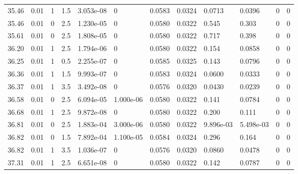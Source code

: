 \documentclass[preview]{standalone}
\begin{document}
{{{{{{\begin{tabular}{L{1.2cm}C{1.2cm} C{0.3cm}C{0.5cm} C{1.4cm}C{1.4cm} C{1.4cm}C{1.4cm} C{1.6cm}C{1.6cm} C{1.6cm}C{1.6cm}}
  35.46  &  0.01  & 1     & 1.5 &  3.053e-08  & 0  &  0.0583&   0.0324& 0.0713 & 0.0396   &  0 & 0  \\ 
  35.46  &  0.01  & 0     & 2.5 &  1.230e-05  & 0  &  0.0580&   0.0322& 0.545 & 0.303   &  0 & 0  \\ 
  35.61  &  0.01  & 0     & 2.5 &  1.808e-05  & 0  &  0.0580&   0.0322& 0.717 & 0.398   &  0 & 0  \\ 
  36.20  &  0.01  & 1     & 2.5 &  1.794e-06  & 0  &  0.0580&   0.0322& 0.154 & 0.0858   &  0 & 0  \\ 
  36.25  &  0.01  & 1     & 0.5 &  2.255e-07  & 0  &  0.0585&   0.0325& 0.143 & 0.0796   &  0 & 0  \\ 
  36.36  &  0.01  & 1     & 1.5 &  9.993e-07  & 0  &  0.0583&   0.0324& 0.0600 & 0.0333   &  0 & 0  \\ 
  36.37  &  0.01  & 1     & 3.5 &  3.492e-08  & 0  &  0.0576&   0.0320& 0.0430 & 0.0239   &  0 & 0  \\ 
  36.58  &  0.01  & 0     & 2.5 &  6.094e-05  & 1.000e-06  &  0.0580&   0.0322& 0.141 & 0.0784   &  0 & 0  \\ 
  36.68  &  0.01  & 1     & 2.5 &  9.872e-08  & 0  &  0.0580&   0.0322& 0.200 & 0.111   &  0 & 0  \\ 
  36.81  &  0.01  & 0     & 2.5 &  1.883e-04  & 3.000e-06  &  0.0580&   0.0322& 9.896e-03 & 5.498e-03   &  0 & 0  \\ 
  36.82  &  0.01  & 0     & 1.5 &  7.892e-04  & 1.100e-05  &  0.0584&   0.0324& 0.296 & 0.164   &  0 & 0  \\ 
  36.82  &  0.01  & 1     & 3.5 &  1.036e-07  & 0  &  0.0576&   0.0320& 0.0860 & 0.0478   &  0 & 0  \\ 
  37.31  &  0.01  & 1     & 2.5 &  6.651e-08  & 0  &  0.0580&   0.0322& 0.142 & 0.0787   &  0 & 0  \\ 
\hline 
\end{tabular} 

}}}}}}
\end{document}
